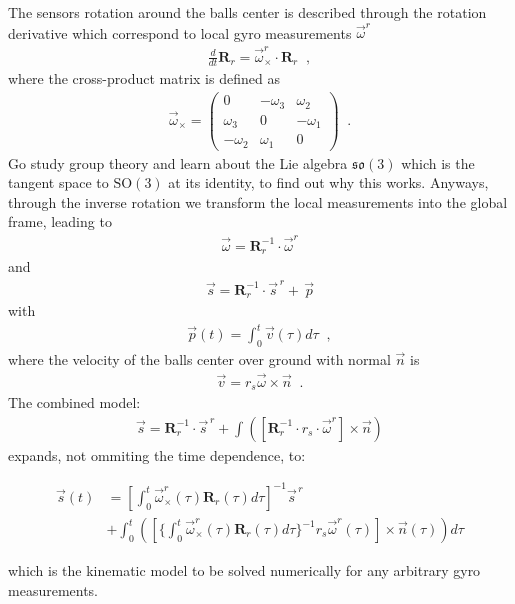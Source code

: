 The sensors rotation around the balls center is described through the rotation derivative which correspond to local gyro measurements $\vec{\omega}^r$   
\begin{align}
\frac{d}{dt}{\mathbf{R}}_r = \vec{\omega}^r_{\times} \cdot \mathbf{R}_r \;\; ,
\end{align}
where the cross-product matrix is defined as 
\begin{align}
\vec{\omega}_{\times} = 
\begin{pmatrix}
0 & -\omega_3 & \omega_2\\
\omega_3 & 0 & -\omega_1\\
-\omega_2 & \omega_1 & 0
\end{pmatrix} \;\; .
\end{align}
Go study group theory and learn about the Lie algebra $\mathfrak{so}(3)$ which is the tangent space to $\textrm{SO}(3)$ at its identity, to find out why this works. 
Anyways, through the inverse rotation we transform the local measurements into the global frame, leading to 
\begin{align}
\vec{\omega} = \mathbf{R}_r^{-1} \cdot \vec{\omega}^r
\end{align}
and
\begin{align}
\vec{s} = \mathbf{R}_r^{-1} \cdot \vec{s}^{\,r} + \,\vec{p}
\end{align}
with 
\begin{align}
\vec{p}(t) = \int_0^t \vec{v}(\tau) d\tau \;\; ,
\end{align}
where the velocity of the balls center over ground with normal $\vec{n}$ is
\begin{align}
\vec{v} = r_s \vec{\omega} \times \vec{n}\;\; .
\end{align}
The combined model:
\begin{align}
\vec{s} = \mathbf{R}_r^{-1} \cdot \vec{s}^{\,r} + \int \left( \left[ \mathbf{R}_r^{-1} \cdot r_s \cdot \vec{\omega}^r \right] \times \vec{n}\right)
\end{align}
expands, not ommiting the time dependence, to:
\begin{small}
  \begin{align}
    \vec{s}(t) &= \left[ \int_0^t \vec{\omega}^r_{\times}(\tau)\mathbf{R}_r(\tau)d\tau \right]^{-1} \vec{s}^{\,r} \\ \nonumber
    &+ \int_0^t\left( \left[ \bigg\{ \int_0^t \vec{\omega}^r_{\times}(\tau)\mathbf{R}_r(\tau)d\tau \bigg\} ^{-1} r_s \vec{\omega}^r(\tau) \right]\times \vec{n}(\tau) \right) d\tau
  \end{align}
\end{small}
which is the kinematic model to be solved numerically for any arbitrary gyro measurements.


